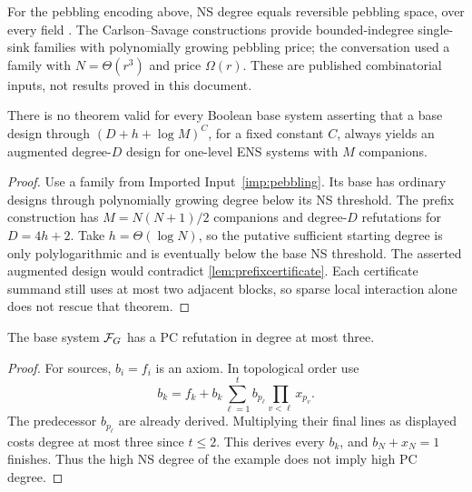 \begin{imported}\label{imp:pebbling}
For the pebbling encoding above, NS degree equals reversible pebbling space, over every field \cite[Theorem 3.1]{Pebbling}. The Carlson--Savage constructions provide bounded-indegree single-sink families with polynomially growing pebbling price; the conversation used a family with $N=\Theta(r^3)$ and price $\Omega(r)$. These are published combinatorial inputs, not results proved in this document.
\end{imported}

\begin{corollary}\label{cor:genericbatchfalse}
There is no theorem valid for every Boolean base system asserting that a base design through $(D+h+\log M)^C$, for a fixed constant $C$, always yields an augmented degree-$D$ design for one-level ENS systems with $M$ companions.
\end{corollary}
\begin{proof}
Use a family from Imported Input~\ref{imp:pebbling}. Its base has ordinary designs through polynomially growing degree below its NS threshold. The prefix construction has $M=N(N+1)/2$ companions and degree-$D$ refutations for $D=4h+2$. Take $h=\Theta(\log N)$, so the putative sufficient starting degree is only polylogarithmic and is eventually below the base NS threshold. The asserted augmented design would contradict \cref{lem:prefixcertificate}. Each certificate summand still uses at most two adjacent blocks, so sparse local interaction alone does not rescue that theorem.
\end{proof}

\begin{lemma}\label{lem:pebblingpc}
The base system $\mathcal F_G$ has a PC refutation in degree at most three.
\end{lemma}
\begin{proof}
For sources, $b_i=f_i$ is an axiom. In topological order use
\[
 b_k=f_k+b_k\sum_{\ell=1}^t b_{p_\ell}
              \prod_{v<\ell}x_{p_v}.
\]
The predecessor $b_{p_\ell}$ are already derived. Multiplying their final lines as displayed costs degree at most three since $t\le2$. This derives every $b_k$, and $b_N+x_N=1$ finishes. Thus the high NS degree of the example does not imply high PC degree.
\end{proof}

